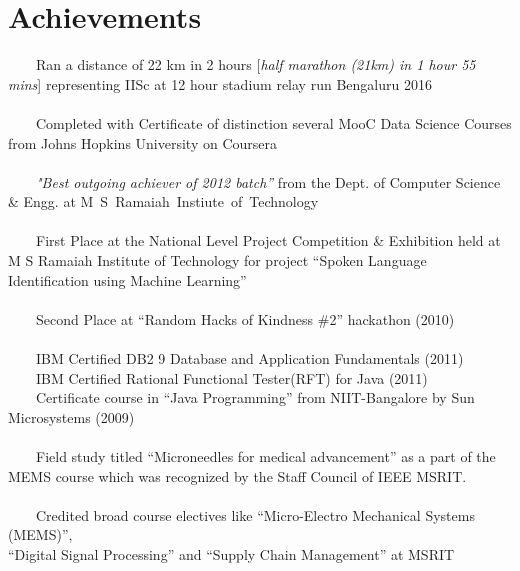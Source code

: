 \documentclass[a4paper,10pt]{article} %
\newcommand{\tabitem}{~~\llap{\textbullet}~~}
\begin{document}

\section{Achievements}
\tabitem Ran a distance of 22 km in 2 hours [\textit{half marathon (21km) in 1 hour 55 mins}] representing IISc at 12 hour stadium relay run Bengaluru 2016\\
\\
\tabitem Completed with Certificate of distinction several MooC Data Science Courses from Johns Hopkins University on Coursera\\
\\
\tabitem \textit{"Best outgoing achiever of 2012 batch”} from the Dept. of Computer Science \& Engg. at \mbox{M S Ramaiah Instiute of Technology} \\
\\
\tabitem First Place at the National Level Project Competition \& Exhibition held at M S Ramaiah Institute of Technology for project “Spoken Language Identification using Machine Learning”\\
\\
\tabitem Second Place at “Random Hacks of Kindness \#2” hackathon (2010)\\
\\
\tabitem IBM Certified DB2 9 Database and Application Fundamentals (2011)\\
\tabitem IBM Certified Rational Functional Tester(RFT) for Java (2011)\\
\tabitem Certificate course in “Java Programming” from NIIT-Bangalore by Sun Microsystems (2009)\\
\\
\tabitem Field study titled “Microneedles for medical advancement” as a part of the MEMS course which was recognized by the Staff Council of IEEE MSRIT.\\
\\
\tabitem Credited broad course electives like “Micro-Electro Mechanical Systems (MEMS)”, \\“Digital Signal Processing” and “Supply Chain Management” at MSRIT \\
\\
\end{document}
